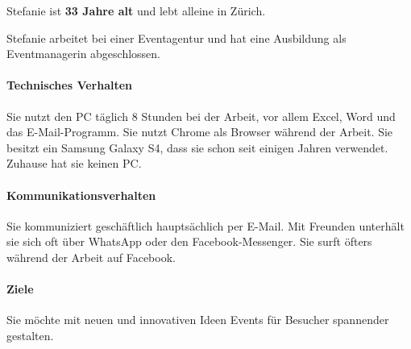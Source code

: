 \begin{minipage}{0.70\textwidth}
Stefanie ist \textbf{33 Jahre alt} und lebt alleine in Zürich.

Stefanie arbeitet bei einer Eventagentur und hat eine Ausbildung als Eventmanagerin abgeschlossen.

\paragraph{Technisches Verhalten}
Sie nutzt den PC täglich 8 Stunden bei der Arbeit, vor allem Excel, Word und das E-Mail-Programm. Sie nutzt Chrome als Browser während der Arbeit. Sie besitzt ein Samsung Galaxy S4, dass sie schon seit einigen Jahren verwendet. Zuhause hat sie keinen PC.
\paragraph{Kommunikationsverhalten}
Sie kommuniziert geschäftlich hauptsächlich per E-Mail. Mit Freunden unterhält sie sich oft über WhatsApp oder den Facebook-Messenger. Sie surft öfters während der Arbeit auf Facebook.
\paragraph{Ziele}
Sie möchte mit neuen und innovativen Ideen Events für Besucher spannender gestalten.
\end{minipage}

